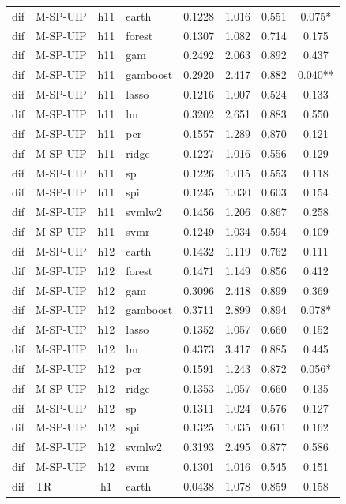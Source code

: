 \begin{ThreePartTable}
\begin{longtable}[t]{llclcccc}
\addlinespace
dif & M-SP-UIP & h11 & earth & 0.1228 & 1.016 & 0.551 & 0.075*\\
dif & M-SP-UIP & h11 & forest & 0.1307 & 1.082 & 0.714 & 0.175\\
dif & M-SP-UIP & h11 & gam & 0.2492 & 2.063 & 0.892 & 0.437\\
dif & M-SP-UIP & h11 & gamboost & 0.2920 & 2.417 & 0.882 & 0.040**\\
dif & M-SP-UIP & h11 & lasso & 0.1216 & 1.007 & 0.524 & 0.133\\
dif & M-SP-UIP & h11 & lm & 0.3202 & 2.651 & 0.883 & 0.550\\
dif & M-SP-UIP & h11 & pcr & 0.1557 & 1.289 & 0.870 & 0.121\\
dif & M-SP-UIP & h11 & ridge & 0.1227 & 1.016 & 0.556 & 0.129\\
dif & M-SP-UIP & h11 & sp & 0.1226 & 1.015 & 0.553 & 0.118\\
dif & M-SP-UIP & h11 & spi & 0.1245 & 1.030 & 0.603 & 0.154\\
dif & M-SP-UIP & h11 & svmlw2 & 0.1456 & 1.206 & 0.867 & 0.258\\
dif & M-SP-UIP & h11 & svmr & 0.1249 & 1.034 & 0.594 & 0.109\\
\addlinespace
dif & M-SP-UIP & h12 & earth & 0.1432 & 1.119 & 0.762 & 0.111\\
dif & M-SP-UIP & h12 & forest & 0.1471 & 1.149 & 0.856 & 0.412\\
dif & M-SP-UIP & h12 & gam & 0.3096 & 2.418 & 0.899 & 0.369\\
dif & M-SP-UIP & h12 & gamboost & 0.3711 & 2.899 & 0.894 & 0.078*\\
dif & M-SP-UIP & h12 & lasso & 0.1352 & 1.057 & 0.660 & 0.152\\
dif & M-SP-UIP & h12 & lm & 0.4373 & 3.417 & 0.885 & 0.445\\
dif & M-SP-UIP & h12 & pcr & 0.1591 & 1.243 & 0.872 & 0.056*\\
dif & M-SP-UIP & h12 & ridge & 0.1353 & 1.057 & 0.660 & 0.135\\
dif & M-SP-UIP & h12 & sp & 0.1311 & 1.024 & 0.576 & 0.127\\
dif & M-SP-UIP & h12 & spi & 0.1325 & 1.035 & 0.611 & 0.162\\
dif & M-SP-UIP & h12 & svmlw2 & 0.3193 & 2.495 & 0.877 & 0.586\\
dif & M-SP-UIP & h12 & svmr & 0.1301 & 1.016 & 0.545 & 0.151\\
\addlinespace
dif & TR & h1 & earth & 0.0438 & 1.078 & 0.859 & 0.158\\

\end{longtable}
\end{ThreePartTable}
